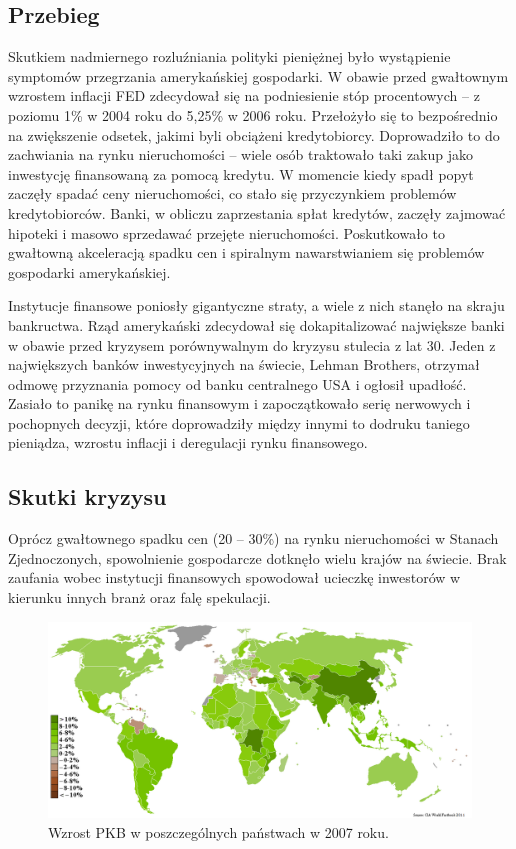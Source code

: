 \subsection{Przebieg}

Skutkiem nadmiernego rozluźniania polityki pieniężnej było wystąpienie symptomów przegrzania amerykańskiej gospodarki. W obawie przed gwałtownym wzrostem inflacji FED zdecydował się na podniesienie stóp procentowych – z poziomu 1\% w 2004 roku do 5,25\% w 2006 roku. Przełożyło się to bezpośrednio na zwiększenie odsetek, jakimi byli obciążeni kredytobiorcy. Doprowadziło to do zachwiania na rynku nieruchomości – wiele osób traktowało taki zakup jako inwestycję finansowaną za pomocą kredytu. W momencie kiedy spadł popyt zaczęły spadać ceny nieruchomości, co stało się przyczynkiem problemów kredytobiorców. Banki, w obliczu zaprzestania spłat kredytów, zaczęły zajmować hipoteki i masowo sprzedawać przejęte nieruchomości. Poskutkowało to gwałtowną akceleracją spadku cen i spiralnym nawarstwianiem się problemów gospodarki amerykańskiej.

Instytucje finansowe poniosły gigantyczne straty, a wiele z nich stanęło na skraju bankructwa. Rząd amerykański zdecydował się dokapitalizować największe banki w obawie przed kryzysem porównywalnym do kryzysu stulecia z lat 30. Jeden z największych banków inwestycyjnych na świecie, Lehman Brothers, otrzymał odmowę przyznania pomocy od banku centralnego USA i ogłosił upadłość. Zasiało to panikę na rynku finansowym i zapoczątkowało serię nerwowych i pochopnych decyzji, które doprowadziły między innymi to dodruku taniego pieniądza, wzrostu inflacji i deregulacji rynku finansowego.

\subsection{Skutki kryzysu}

Oprócz gwałtownego spadku cen (20 – 30\%) na rynku nieruchomości w Stanach Zjednoczonych, spowolnienie gospodarcze dotknęło wielu krajów na świecie. Brak zaufania wobec instytucji finansowych spowodował ucieczkę inwestorów w kierunku innych branż oraz falę spekulacji.

\begin{figure}[h] \centering %
	\includegraphics{img/gdp_rate_2007.png}
	\caption{Wzrost PKB w poszczególnych państwach w 2007 roku.\cite{CIA}}
	\label{gdp_rate_2007}
\end{figure}

